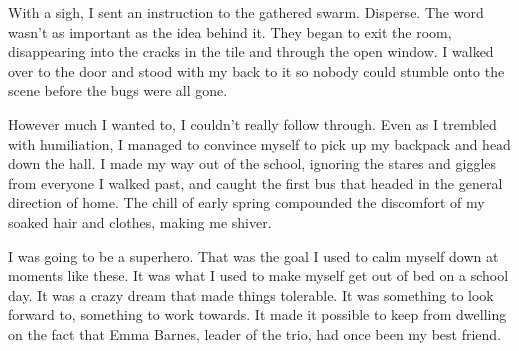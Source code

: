 With a sigh, I sent an instruction to the gathered swarm.   Disperse.  The word wasn't as important  as the idea behind it.  They began to exit the room, disappearing into the cracks in the tile and through the open window.  I walked over to the door and stood with my back to it so nobody could stumble onto the scene before the bugs were all gone.



However much I wanted to, I couldn't really follow through.  Even as I trembled with humiliation, I managed to convince myself to pick up my backpack and head down the hall.  I made my way out of the school, ignoring the stares and giggles from everyone I walked past, and caught the first bus that headed in the general direction of home.  The chill of early spring compounded the discomfort of my soaked hair and clothes, making me shiver.



I was going to be a superhero.  That was the goal I used to calm myself down at moments like these.  It was what I used to make myself get out of bed on a school day.  It was a crazy dream that made things tolerable.  It was something to look forward to, something to work towards.  It made it possible to keep from dwelling on the fact that Emma Barnes, leader of the trio, had once been my best friend.





